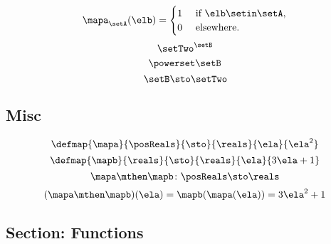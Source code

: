 {\begin{forslides}
\begin{equation}
            \mapa_\setA(\elb) = \begin{cases}
                1 & \text{ if }\elb\setin\setA, \\
                0 & \text{ elsewhere}.
            \end{cases}
        \end{equation}
        \begin{equation}
            \label{eq:slides_session2_195}
            \setTwo^\setB
        \end{equation}
        \begin{equation}
            \label{eq:slides_session2_196}
            \powerset \setB
        \end{equation}
        \begin{equation}
            \label{eq:slides_session2_197}
            \setB \sto \setTwo
        \end{equation}

        \subsection{Misc}

        \begin{equation}
            \label{eq:slides_session2_198}
            \defmap{\mapa}{\posReals}{\sto}{\reals}{\ela}{\ela^2}
        \end{equation}
        \begin{equation}
            \label{eq:slides_session2_199}
            \defmap{\mapb}{\reals}{\sto}{\reals}{\ela}{3\ela + 1}
        \end{equation}
        \begin{equation}
            \label{eq:slides_session2_200}
            \mapa \mthen \mapb \colon \posReals \sto \reals
        \end{equation}
        \begin{equation}
            \label{eq:slides_session2_201}
            (\mapa \mthen \mapb)(\ela) = \mapb(\mapa(\ela)) = 3 \ela^2 + 1
        \end{equation}

        \subsection{Section: Functions}


\end{forslides}}
